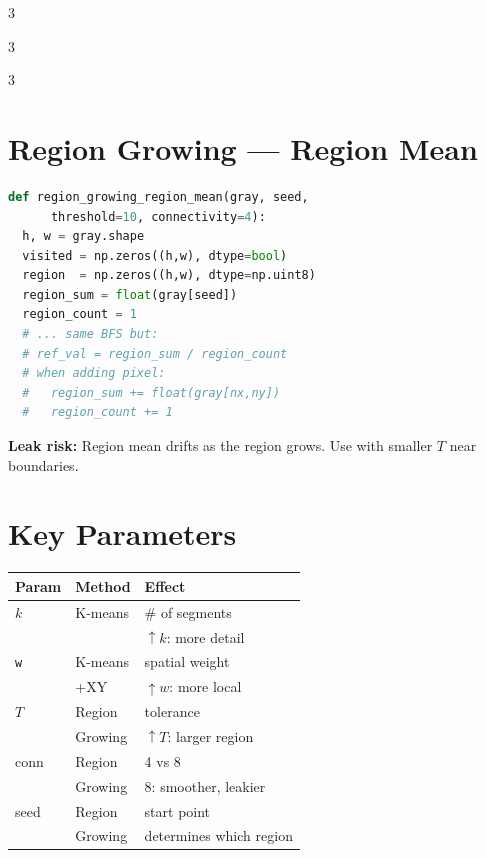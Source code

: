 \documentclass[9pt,landscape,a4paper]{extarticle}
\begin{document}
\begin{multicols*}{3}
\begin{multicols*}{3}
\begin{multicols}{3}
\section{Region Growing --- Region Mean}

\begin{lstlisting}[language=Python]
def region_growing_region_mean(gray, seed,
      threshold=10, connectivity=4):
  h, w = gray.shape
  visited = np.zeros((h,w), dtype=bool)
  region  = np.zeros((h,w), dtype=np.uint8)
  region_sum = float(gray[seed])
  region_count = 1
  # ... same BFS but:
  # ref_val = region_sum / region_count
  # when adding pixel:
  #   region_sum += float(gray[nx,ny])
  #   region_count += 1
\end{lstlisting}

\begin{notebox}
\textbf{Leak risk:} Region mean drifts as the region grows. Use with smaller $T$ near boundaries.
\end{notebox}

\section{Key Parameters}

\begin{center}
\begin{tabular}{@{}lll@{}}
\toprule
\textbf{Param} & \textbf{Method} & \textbf{Effect} \\
\midrule
$k$ & K-means & \# of segments \\
& & $\uparrow k$: more detail\\
\texttt{w} & K-means & spatial weight\\
& +XY & $\uparrow w$: more local\\
$T$ & Region & tolerance\\
& Growing & $\uparrow T$: larger region\\
conn & Region & 4 vs 8\\
& Growing & 8: smoother, leakier\\
seed & Region & start point\\
& Growing & determines which region\\
\bottomrule
\end{tabular}
\end{center}


\end{multicols}
\end{multicols*}
\end{multicols*}
\end{document}
